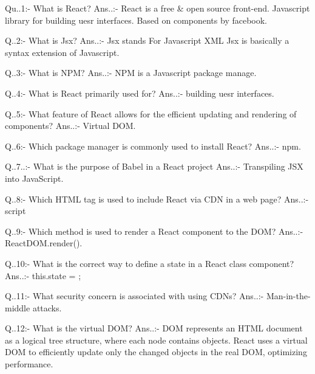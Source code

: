 Qu..1:- What is React?
Ans..:- React is a free & open source front-end. Javascript library for building uesr interfaces. Based on components by facebook.

Q..2:-  What is Jsx?
Ans..:- Jsx stands For Javascript XML Jsx is basically a syntax extension of Javascript.

Q..3:-  What is NPM?
Ans..:- NPM is a Javascript package manage.

Q..4:-  What is React primarily used for?
Ans..:- building uesr interfaces.

Q..5:-  What feature of React allows for the efficient updating and rendering of components?
Ans..:- Virtual DOM.

Q..6:-  Which package manager is commonly used to install React?
Ans..:- npm.

Q..7..:- What is the purpose of Babel in a React project
Ans..:- Transpiling JSX into JavaScript.

Q..8:-  Which HTML tag is used to include React via CDN in a web page?
Ans..:- script 

Q..9:-  Which method is used to render a React component to the DOM?
Ans..:- ReactDOM.render().

Q..10:- What is the correct way to define a state in a React class component?
Ans..:- this.state = {};

Q..11:- What security concern is associated with using CDNs?
Ans..:- Man-in-the-middle attacks.

Q..12:- What is the virtual DOM?
Ans..:- DOM represents an HTML document as a logical tree structure, where each node contains objects. React uses a virtual DOM to efficiently update only the changed objects in the real DOM, optimizing performance.

